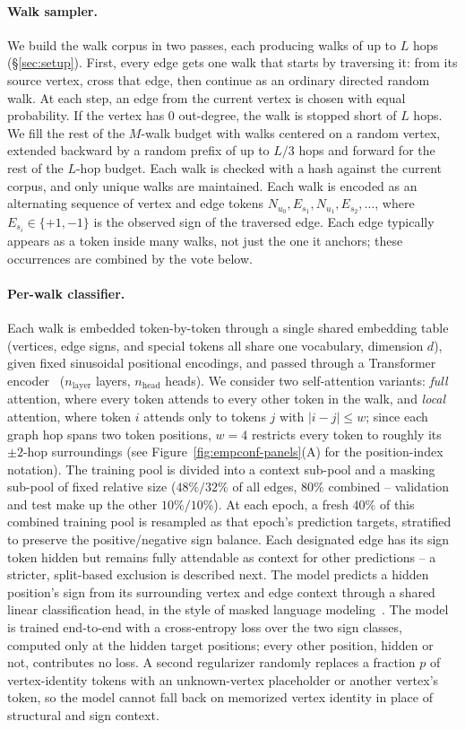 \documentclass[sigconf, review, anonymous]{acmart}
\theoremstyle{plain}
\theoremstyle{definition}
\begin{document}
\paragraph{Walk sampler.} We build the walk corpus in two passes, each producing walks of up to $L$ hops (\S\ref{sec:setup}). First, every edge gets one walk that starts by traversing it: from its source vertex, cross that edge, then continue as an ordinary directed random walk. At each step, an edge from the current vertex is chosen with equal probability. If the vertex has 0 out-degree, the walk is stopped short of $L$ hops. We fill the rest of the $M$-walk budget with walks centered on a random vertex, extended backward by a random prefix of up to $L/3$ hops and forward for the rest of the $L$-hop budget. Each walk is checked with a hash against the current corpus, and only unique walks are maintained. Each walk is encoded as an alternating sequence of vertex and edge tokens $N_{u_0}, E_{s_1}, N_{u_1}, E_{s_2}, \ldots$, where $E_{s_i}\in\{+1,-1\}$ is the observed sign of the traversed edge. Each edge typically appears as a token inside many walks, not just the one it anchors; these occurrences are combined by the vote below.

\paragraph{Per-walk classifier.} Each walk is embedded token-by-token through a single shared embedding table (vertices, edge signs, and special tokens all share one vocabulary, dimension $d$), given fixed sinusoidal positional encodings, and passed through a Transformer encoder~\citep{vaswani2017attention} ($n_\text{layer}$ layers, $n_\text{head}$ heads). We consider two self-attention variants: \emph{full} attention, where every token attends to every other token in the walk, and \emph{local} attention, where token $i$ attends only to tokens $j$ with $|i-j|\le w$; since each graph hop spans two token positions, $w=4$ restricts every token to roughly its $\pm2$-hop surroundings (see Figure~\ref{fig:empconf-panels}(A) for the position-index notation). The training pool is divided into a context sub-pool and a masking sub-pool of fixed relative size ($48\%/32\%$ of all edges, $80\%$ combined -- validation and test make up the other $10\%/10\%$). At each epoch, a fresh $40\%$ of this combined training pool is resampled as that epoch's prediction targets, stratified to preserve the positive/negative sign balance. Each designated edge has its sign token hidden but remains fully attendable as context for other predictions -- a stricter, split-based exclusion is described next. The model predicts a hidden position's sign from its surrounding vertex and edge context through a shared linear classification head, in the style of masked language modeling~\citep{devlin2019bert}. The model is trained end-to-end with a cross-entropy loss over the two sign classes, computed only at the hidden target positions; every other position, hidden or not, contributes no loss. A second regularizer randomly replaces a fraction $p$ of vertex-identity tokens with an unknown-vertex placeholder or another vertex's token, so the model cannot fall back on memorized vertex identity in place of structural and sign context.
\end{document}
